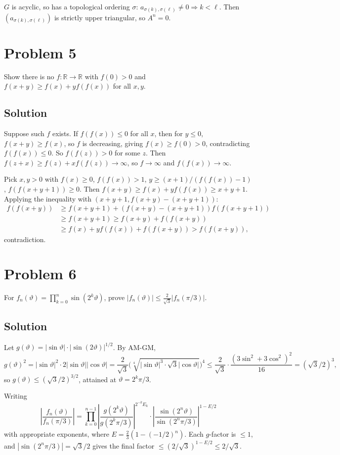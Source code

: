 \documentclass{article}
\begin{document}
$G$ is acyclic, so has a topological ordering $\sigma$: $a_{\sigma(k),\sigma(\ell)}\ne 0 \Rightarrow k<\ell$. Then $(a_{\sigma(k),\sigma(\ell)})$ is strictly upper triangular, so $A^n=0$.

\section*{Problem 5}
Show there is no $f:\mathbb{R}\to\mathbb{R}$ with $f(0)>0$ and $f(x+y)\ge f(x)+yf(f(x))$ for all $x,y$.

\subsection*{Solution}
Suppose such $f$ exists. If $f(f(x))\le 0$ for all $x$, then for $y\le 0$, $f(x+y)\ge f(x)$, so $f$ is decreasing, giving $f(x)\ge f(0)>0$, contradicting $f(f(x))\le 0$. So $f(f(z))>0$ for some $z$. Then $f(z+x)\ge f(z)+xf(f(z))\to\infty$, so $f\to\infty$ and $f(f(x))\to\infty$.

Pick $x,y>0$ with $f(x)\ge 0$, $f(f(x))>1$, $y\ge (x+1)/(f(f(x))-1)$, $f(f(x+y+1))\ge 0$. Then $f(x+y)\ge f(x)+yf(f(x))\ge x+y+1$. Applying the inequality with $(x+y+1, f(x+y)-(x+y+1))$:
\begin{align*}
f(f(x+y)) &\ge f(x+y+1) + (f(x+y)-(x+y+1))f(f(x+y+1))\\
&\ge f(x+y+1) \ge f(x+y) + f(f(x+y))\\
&\ge f(x) + yf(f(x)) + f(f(x+y)) > f(f(x+y)),
\end{align*}
contradiction.

\section*{Problem 6}
For $f_n(\vartheta) = \prod_{k=0}^n \sin(2^k \vartheta)$, prove $|f_n(\vartheta)| \le \frac{2}{\sqrt 3}|f_n(\pi/3)|$.

\subsection*{Solution}
Let $g(\vartheta) = |\sin\vartheta|\cdot|\sin(2\vartheta)|^{1/2}$. By AM-GM,
\[g(\vartheta)^2 = |\sin\vartheta|^2\cdot 2|\sin\vartheta||\cos\vartheta| = \frac{2}{\sqrt 3}\big(\sqrt[4]{|\sin\vartheta|^3\cdot\sqrt 3|\cos\vartheta|}\big)^4 \le \frac{2}{\sqrt 3}\cdot\frac{(3\sin^2+3\cos^2)^2}{16} = (\sqrt 3 / 2)^3,\]
so $g(\vartheta)\le (\sqrt 3/2)^{3/2}$, attained at $\vartheta=2^k\pi/3$.

Writing
\[\left|\frac{f_n(\vartheta)}{f_n(\pi/3)}\right| = \prod_{k=0}^{n-1}\left|\frac{g(2^k\vartheta)}{g(2^k\pi/3)}\right|^{2^{-k}E_k}\cdot \left|\frac{\sin(2^n\vartheta)}{\sin(2^n\pi/3)}\right|^{1-E/2}\]
with appropriate exponents, where $E = \frac{2}{3}(1-(-1/2)^n)$. Each $g$-factor is $\le 1$, and $|\sin(2^n\pi/3)|=\sqrt 3/2$ gives the final factor $\le (2/\sqrt 3)^{1-E/2}\le 2/\sqrt 3$.
\end{document}
